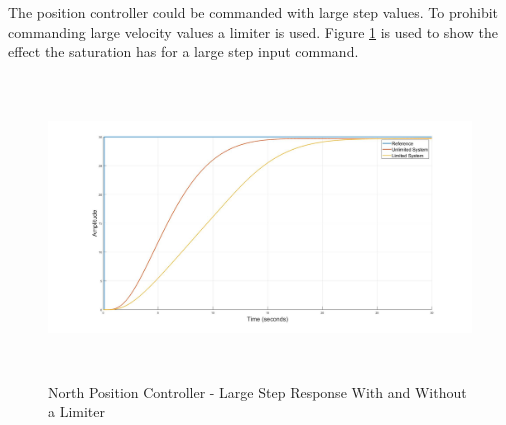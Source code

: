 \documentclass[12pt]{report}
\begin{document}
The position controller could be commanded with large step values. To prohibit commanding large velocity values a limiter is used. Figure \ref{IM_NorthPosControlLargeStep} is used to show the effect the saturation has for a large step input command. 

\begin{figure}[H]
	\centering
	\includegraphics[height = 8cm]{../Design/Matlab/Controllers/north_pos_limit_step.jpg}
	\caption{North Position Controller -  Large Step Response With and Without a Limiter}
	\label{IM_NorthPosControlLargeStep}
\end{figure}
\end{document}
